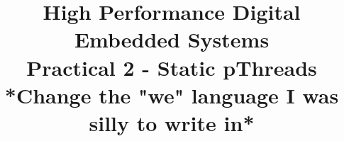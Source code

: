 

\title{High Performance Digital Embedded Systems\\
\LARGE Practical 2 - Static pThreads \\
*Change the "we" language I was silly to write in*}

\author{%
 \setcounter{author}{1}
 \setcounter{author}{1}
}


\begin{sloppypar}

\maketitle











\end{sloppypar}


